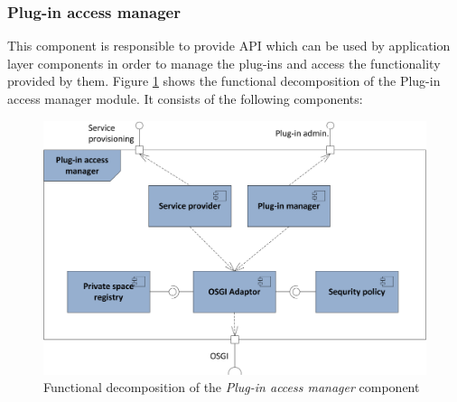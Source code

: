 \subsubsection{Plug-in access manager}

This component is responsible to provide API which can be used by application layer components in order to manage the plug-ins and access the functionality provided by them. Figure \ref{fig_access_func} shows the functional decomposition of the Plug-in access manager module. It consists of the following components:


\begin{figure}[h!]
  \centering
  	\includegraphics[scale=0.85]{plug-in/layers/access-func.png}
  \caption{Functional decomposition of the \textit{Plug-in access manager} component}
  \label{fig_access_func}
\end{figure}

